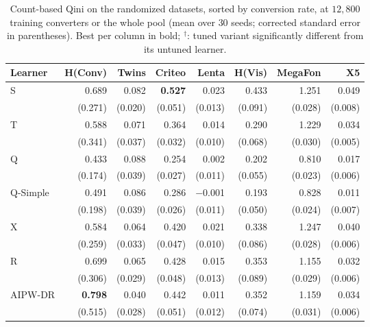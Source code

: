 \documentclass{article}
\begin{document}
\begin{table}[H]
\centering
\caption{Count-based Qini on the randomized datasets, sorted by conversion
rate, at $12{,}800$ training converters or the whole pool (mean over $30$
seeds; corrected standard error in parentheses). Best per column in bold;
$^\dagger$: tuned variant significantly different from its untuned learner.}
\label{tab:app-rct-qini}
\footnotesize
\setlength{\tabcolsep}{3pt}
\begin{tabular}{l|rrrrrrr}
\hline
Learner & H(Conv) & Twins & Criteo & Lenta & H(Vis) & MegaFon & X5 \\
\hline
S & 0.689 & 0.082 & \textbf{0.527} & 0.023 & 0.433 & 1.251 & 0.049 \\
 & \scriptsize (0.271) & \scriptsize (0.020) & \scriptsize (0.051) & \scriptsize (0.013) & \scriptsize (0.091) & \scriptsize (0.028) & \scriptsize (0.008) \\[2pt]
T & 0.588 & 0.071 & 0.364 & 0.014 & 0.290 & 1.229 & 0.034 \\
 & \scriptsize (0.341) & \scriptsize (0.037) & \scriptsize (0.032) & \scriptsize (0.010) & \scriptsize (0.068) & \scriptsize (0.030) & \scriptsize (0.005) \\[2pt]
\hline
Q & 0.433 & 0.088 & 0.254 & 0.002 & 0.202 & 0.810 & 0.017 \\
 & \scriptsize (0.174) & \scriptsize (0.039) & \scriptsize (0.027) & \scriptsize (0.011) & \scriptsize (0.055) & \scriptsize (0.023) & \scriptsize (0.006) \\[2pt]
Q-Simple & 0.491 & 0.086 & 0.286 & $-$0.001 & 0.193 & 0.828 & 0.011 \\
 & \scriptsize (0.198) & \scriptsize (0.039) & \scriptsize (0.026) & \scriptsize (0.011) & \scriptsize (0.050) & \scriptsize (0.024) & \scriptsize (0.007) \\[2pt]
\hline
X & 0.584 & 0.064 & 0.420 & 0.021 & 0.338 & 1.247 & 0.040 \\
 & \scriptsize (0.259) & \scriptsize (0.033) & \scriptsize (0.047) & \scriptsize (0.010) & \scriptsize (0.086) & \scriptsize (0.028) & \scriptsize (0.006) \\[2pt]
R & 0.699 & 0.065 & 0.428 & 0.015 & 0.353 & 1.155 & 0.032 \\
 & \scriptsize (0.306) & \scriptsize (0.029) & \scriptsize (0.048) & \scriptsize (0.013) & \scriptsize (0.089) & \scriptsize (0.029) & \scriptsize (0.006) \\[2pt]
AIPW-DR & \textbf{0.798} & 0.040 & 0.442 & 0.011 & 0.352 & 1.159 & 0.034 \\
 & \scriptsize (0.515) & \scriptsize (0.028) & \scriptsize (0.051) & \scriptsize (0.012) & \scriptsize (0.074) & \scriptsize (0.031) & \scriptsize (0.006) \\[2pt]

\end{tabular}
\end{table}
\end{document}
